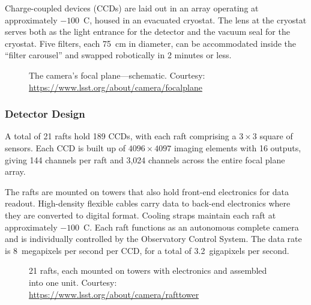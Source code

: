 \documentclass[12pt,a4paper]{article}
\begin{document}
Charge-coupled devices (CCDs) are laid out in an array operating at
approximately $-100$~\textdegree{}C, housed in an evacuated cryostat. The
lens at the cryostat serves both as the light entrance for the detector and
the vacuum seal for the cryostat. Five filters, each 75~cm in diameter, can
be accommodated inside the ``filter carousel'' and swapped robotically in
2 minutes or less.

\begin{figure}[htbp]
  \centering
  \caption{The camera's focal plane---schematic.
           Courtesy: \url{https://www.lsst.org/about/camera/focalplane}}
  \label{fig:focalplane}
\end{figure}

\subsubsection{Detector Design}

A total of 21 rafts hold 189 CCDs, with each raft comprising a $3\times3$
square of sensors. Each CCD is built up of $4096 \times 4097$ imaging
elements with 16 outputs, giving 144 channels per raft and 3{,}024 channels
across the entire focal plane array.

The rafts are mounted on towers that also hold front-end electronics for data
readout. High-density flexible cables carry data to back-end electronics where
they are converted to digital format. Cooling straps maintain each raft at
approximately $-100$~\textdegree{}C. Each raft functions as an autonomous
complete camera and is individually controlled by the Observatory Control
System. The data rate is 8~megapixels per second per CCD, for a total of
3.2~gigapixels per second.

\begin{figure}[htbp]
  \centering
  \caption{21 rafts, each mounted on towers with electronics and assembled
           into one unit. Courtesy: \url{https://www.lsst.org/about/camera/rafttower}}
  \label{fig:rafts}
\end{figure}
\end{document}
